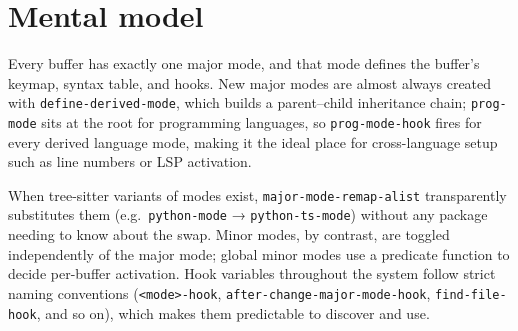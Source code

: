 \section{Mental model}
Every buffer has exactly one major mode, and that mode defines the buffer's keymap, syntax table, and hooks.  New major modes are almost always created with \texttt{define-derived-mode}, which builds a parent--child inheritance chain; \texttt{prog-mode} sits at the root for programming languages, so \texttt{prog-mode-hook} fires for every derived language mode, making it the ideal place for cross-language setup such as line numbers or LSP activation.

When tree-sitter variants of modes exist, \texttt{major-mode-remap-alist} transparently substitutes them (e.g.\ \texttt{python-mode} → \texttt{python-ts-mode}) without any package needing to know about the swap.  Minor modes, by contrast, are toggled independently of the major mode; global minor modes use a predicate function to decide per-buffer activation.  Hook variables throughout the system follow strict naming conventions (\texttt{<mode>-hook}, \texttt{after-change-major-mode-hook}, \texttt{find-file-hook}, and so on), which makes them predictable to discover and use.
